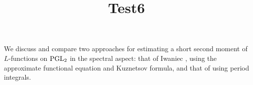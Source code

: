 \documentclass[reqno]{amsart} 
\title{Test6}
\numberwithin{equation}{section}
\numberwithin{theorem}{section}
\begin{document}
\maketitle
\tableofcontents


We discuss and compare two approaches for estimating a short second moment of $L$-functions on $\operatorname{PGL}_2$ in the spectral aspect: that of Iwaniec \cite{Iwaniec1992}, using the approximate functional equation and Kuznetsov formula, and that of \cite{2021arXiv210915230N} using period integrals.




{} 
\end{document}
